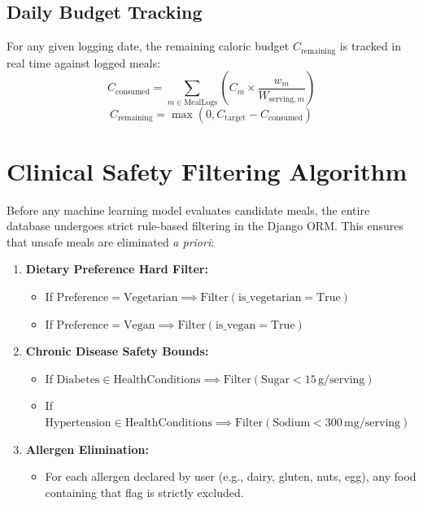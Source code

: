 \documentclass[12pt,a4paper]{report}
\begin{document}
\subsection{Daily Budget Tracking}
For any given logging date, the remaining caloric budget $C_{\text{remaining}}$ is tracked in real time against logged meals:
\begin{equation}
  C_{\text{consumed}} = \sum_{m \in \text{MealLogs}} \left( C_m \times \frac{w_{m}}{W_{\text{serving}, m}} \right)
\end{equation}
\begin{equation}
  C_{\text{remaining}} = \max\left(0, C_{\text{target}} - C_{\text{consumed}}\right)
\end{equation}

\section{Clinical Safety Filtering Algorithm}

Before any machine learning model evaluates candidate meals, the entire database undergoes strict rule-based filtering in the Django ORM. This ensures that unsafe meals are eliminated \textit{a priori}:

\begin{enumerate}[leftmargin=*]
  \item \textbf{Dietary Preference Hard Filter:}
    \begin{itemize}
      \item If $\text{Preference} = \text{Vegetarian} \implies \text{Filter}(\text{is\_vegetarian} = \text{True})$
      \item If $\text{Preference} = \text{Vegan} \implies \text{Filter}(\text{is\_vegan} = \text{True})$
    \end{itemize}
  \item \textbf{Chronic Disease Safety Bounds:}
    \begin{itemize}
      \item If $\text{Diabetes} \in \text{HealthConditions} \implies \text{Filter}(\text{Sugar} < 15\,\text{g/serving})$
      \item If $\text{Hypertension} \in \text{HealthConditions} \implies \text{Filter}(\text{Sodium} < 300\,\text{mg/serving})$
    \end{itemize}
  \item \textbf{Allergen Elimination:}
    \begin{itemize}
      \item For each allergen declared by user (e.g., dairy, gluten, nuts, egg), any food containing that flag is strictly excluded.
    \end{itemize}
\end{enumerate}
\end{document}

